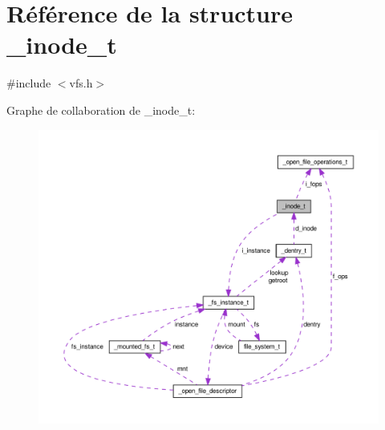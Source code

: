 \hypertarget{struct__inode__t}{\section{Référence de la structure \-\_\-inode\-\_\-t}
\label{struct__inode__t}
}


{\ttfamily \#include $<$vfs.\-h$>$}



Graphe de collaboration de \-\_\-inode\-\_\-t\-:\nopagebreak
\begin{figure}[H]
\begin{center}
\leavevmode
\includegraphics[width=350pt]{struct__inode__t__coll__graph}
\end{center}
\end{figure}

